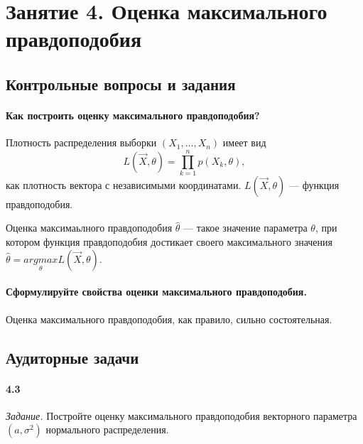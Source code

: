 \chapter*{Занятие 4. Оценка максимального правдоподобия}

\section*{Контрольные вопросы и задания}

\subsubsection*{Как построить оценку максимального правдоподобия?}

Плотность распределения выборки $\left( X_1, \dotsc, X_n \right) $ имеет вид
$$L \left( \vec{X}, \theta \right) =
  \prod \limits_{k = 1}^n p \left( X_k, \theta \right),$$
как плотность вектора с независимыми координатами.
$L \left( \vec{X}, \theta \right) $ --- функция правдоподобия.

Оценка максимаьлного правдоподобия $ \hat{ \theta }$ --- такое значение параметра $ \theta $,
при котором функция правдоподобия достикает своего максимального значения
$ \hat{ \theta } =
  \underset{ \theta }{argmax} L \left( \vec{X}, \theta \right) $.

\subsubsection*{Сформулируйте свойства оценки максимального правдоподобия.}

Оценка максимального правдоподобия, как правило, сильно состоятельная.

\section*{Аудиторные задачи}

\subsubsection*{4.3}

\textit{Задание.}
Постройте оценку максимального правдоподобия векторного параметра $ \left( a, \sigma^2 \right) $
нормального распределения.

